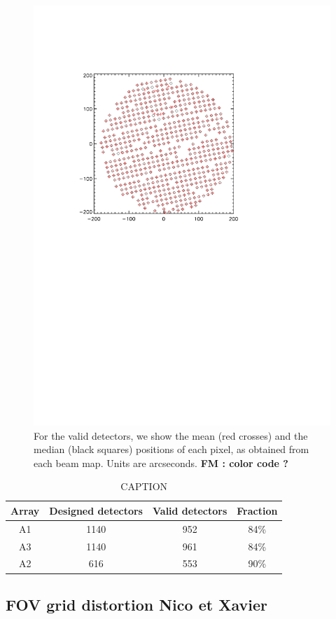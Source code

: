 \begin{figure}[htp]
\begin{center}
\includegraphics[trim=2cm 14cm 5cm 4cm, clip=true,width=0.55\linewidth]{Figures/A2_test_positions.pdf}
\caption[Average KID positions]{For the valid detectors,
  we show the mean (red crosses) and the median (black squares)
  positions of each pixel, as obtained from each beam map.
  Units are arcseconds. {\bf FM : color code ?}}
\label{fig:mean_vs_median}
\end{center}
\end{figure}


\begin{table}[ht]
\begin{center}  
  \begin{tabular}{|c|c|c|c|}
    \hline
    Array & Designed detectors &  Valid detectors & Fraction\\
    \hline\hline
    A1 & 1140 & 952 &  84\%\\
    A3 & 1140 & 961 &  84\%\\
    A2 & 616  & 553 &  90\%\\
    \hline
  \end{tabular}
  \caption[Number of detectors]{ CAPTION}
  \label{tab:number_of_kids}
\end{center}    
\end{table}




\subsection{FOV grid distortion {\color{blue} Nico et Xavier }  }
\label{se:grid_distortion}

